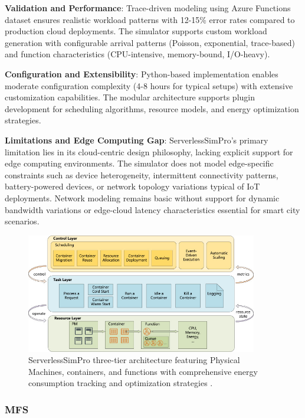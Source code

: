 \textbf{Validation and Performance}: Trace-driven modeling using Azure Functions dataset ensures realistic workload patterns with 12-15\% error rates compared to production cloud deployments. The simulator supports custom workload generation with configurable arrival patterns (Poisson, exponential, trace-based) and function characteristics (CPU-intensive, memory-bound, I/O-heavy).

\textbf{Configuration and Extensibility}: Python-based implementation enables moderate configuration complexity (4-8 hours for typical setups) with extensive customization capabilities. The modular architecture supports plugin development for scheduling algorithms, resource models, and energy optimization strategies.

\textbf{Limitations and Edge Computing Gap}: ServerlessSimPro's primary limitation lies in its cloud-centric design philosophy, lacking explicit support for edge computing environments. The simulator does not model edge-specific constraints such as device heterogeneity, intermittent connectivity patterns, battery-powered devices, or network topology variations typical of IoT deployments. Network modeling remains basic without support for dynamic bandwidth variations or edge-cloud latency characteristics essential for smart city scenarios.


\begin{figure}[htbp]
\centering
\includegraphics[width=0.9\textwidth]{assets/serverlesssimproArch.jpg}
\caption{ServerlessSimPro three-tier architecture featuring Physical Machines, containers, and functions with comprehensive energy consumption tracking and optimization strategies \cite{das2022serverlesssimpro}.}
\label{fig:serverlesssimpro-architecture}
\end{figure}



\subsubsection{MFS}

